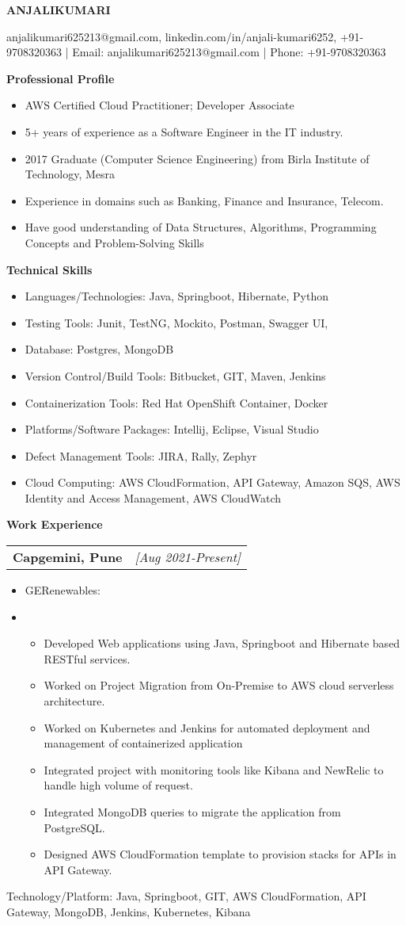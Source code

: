 \documentclass[a4paper,10pt]{article}
\makeatletter
\newcommand{\resitem}[1]{\item #1}
\newcommand{\resheading}[1]{\vspace{0.5em} {\small \colorbox{mygrey}{{\begin{minipage}{0.975\textwidth}{{\textbf{#1}}}\end{minipage}}}} \vspace{0.5em}}
\newcommand{\ressubheading}[3]{\begin{tabular*}{6.62in}{l @{\extracolsep{\fill}} r} \textbf{#1} & \textit{[#2]} \\ \end{tabular*}\vspace{-8pt}}
\makeatother
\begin{document}
\begin{center} \Large{\textbf{ANJALIKUMARI}} \end{center}

\vspace{2pt}

\begin{center} anjalikumari625213@gmail.com, linkedin.com/in/anjali-kumari6252, +91-9708320363 | Email: anjalikumari625213@gmail.com | Phone: +91-9708320363 \end{center}

\resheading{Professional Profile}
\begin{itemize}[nosep]
    \resitem{AWS Certified Cloud Practitioner; Developer Associate}
    \resitem{5+ years of experience as a Software Engineer in the IT industry.}
    \resitem{2017 Graduate (Computer Science Engineering) from Birla Institute of Technology, Mesra}
    \resitem{Experience in domains such as Banking, Finance and Insurance, Telecom.}
    \resitem{Have good understanding of Data Structures, Algorithms, Programming Concepts and Problem-Solving Skills}
\end{itemize}

\resheading{Technical Skills}
\begin{itemize}[nosep]
    \resitem{Languages/Technologies: Java, Springboot, Hibernate, Python}
    \resitem{Testing Tools: Junit, TestNG, Mockito, Postman, Swagger UI,}
    \resitem{Database: Postgres, MongoDB}
    \resitem{Version Control/Build Tools: Bitbucket, GIT, Maven, Jenkins}
    \resitem{Containerization Tools: Red Hat OpenShift Container, Docker}
    \resitem{Platforms/Software Packages: Intellij, Eclipse, Visual Studio}
    \resitem{Defect Management Tools: JIRA, Rally, Zephyr}
    \resitem{Cloud Computing: AWS CloudFormation, API Gateway, Amazon SQS, AWS Identity and Access Management, AWS CloudWatch}
\end{itemize}

\resheading{Work Experience}
\ressubheading{Capgemini, Pune}{Aug 2021-Present}{Senior Consultant}
\begin{itemize}[nosep]
    \resitem{GERenewables:}
    \resitem{\begin{itemize}
        \item Developed Web applications using Java, Springboot and Hibernate based RESTful services.
        \item Worked on Project Migration from On-Premise to AWS cloud serverless architecture.
        \item Worked on Kubernetes and Jenkins for automated deployment and management of containerized application
        \item Integrated project with monitoring tools like Kibana and NewRelic to handle high volume of request.
        \item Integrated MongoDB queries to migrate the application from PostgreSQL.
        \item Designed AWS CloudFormation template to provision stacks for APIs in API Gateway.
    \end{itemize}}
\end{itemize}
Technology/Platform: Java, Springboot, GIT, AWS CloudFormation, API Gateway, MongoDB, Jenkins, Kubernetes, Kibana
\end{document}
